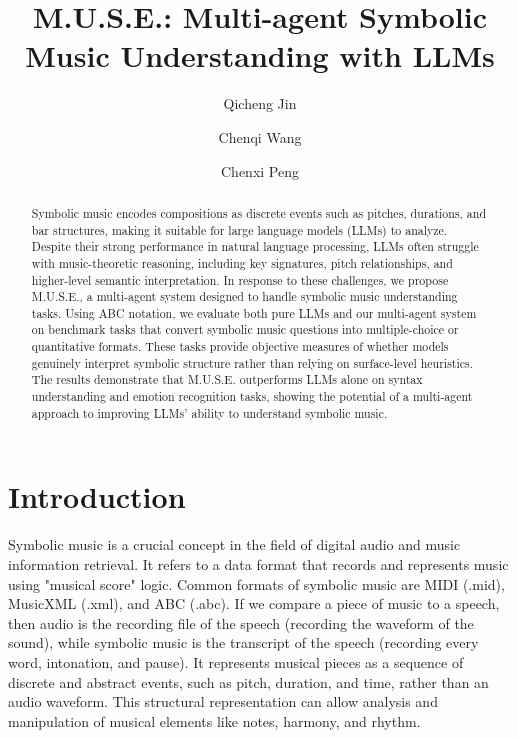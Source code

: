 \documentclass[sigconf]{acmart}
\title{\textbf{M.U.S.E.: Multi-agent Symbolic Music Understanding with LLMs}}
\author{Qicheng Jin}
\affiliation{
  \institution{University of Chicago}
  \city{Chicago}
  \country{United States}
}
\author{Chenqi Wang}
\affiliation{
  \institution{University of Chicago}
  \city{Chicago}
  \country{United States}
}
\author{Chenxi Peng}
\affiliation{
  \institution{University of Chicago}
  \city{Chicago}
  \country{United States}
}
\begin{document}
\begin{abstract}
Symbolic music encodes compositions as discrete events such as pitches, durations, and bar structures, making it suitable for large language models (LLMs) to analyze. Despite their strong performance in natural language processing, LLMs often struggle with music-theoretic reasoning, including key signatures, pitch relationships, and higher-level semantic interpretation. In response to these challenges, we propose M.U.S.E., a multi-agent system designed to handle symbolic music understanding tasks. Using ABC notation, we evaluate both pure LLMs and our multi-agent system on benchmark tasks that convert symbolic music questions into multiple-choice or quantitative formats. These tasks provide objective measures of whether models genuinely interpret symbolic structure rather than relying on surface-level heuristics. The results demonstrate that M.U.S.E. outperforms LLMs alone on syntax understanding and emotion recognition tasks, showing the potential of a multi-agent approach to improving LLMs’ ability to understand symbolic music.
\end{abstract}


\maketitle


\section{Introduction}
Symbolic music is a crucial concept in the field of digital audio and music information retrieval. It refers to a data format that records and represents music using "musical score" logic. Common formats of symbolic music are MIDI (.mid), MusicXML (.xml), and ABC (.abc). If we compare a piece of music to a speech, then audio is the recording file of the speech (recording the waveform of the sound), while symbolic music is the transcript of the speech (recording every word, intonation, and pause). It represents musical pieces as a sequence of discrete and abstract events, such as pitch, duration, and time, rather than an audio waveform. This structural representation can allow analysis and manipulation of musical elements like notes, harmony, and rhythm. 
\end{document}
